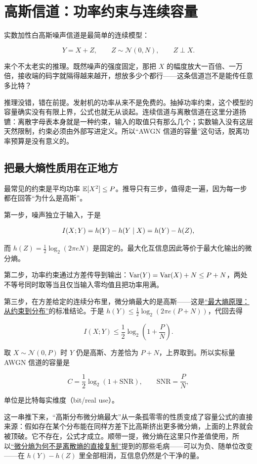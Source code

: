 \section{高斯信道：功率约束与连续容量}
\label{sec:07-Information-Theory/05-Channel-Coding/04}

实数加性白高斯噪声信道是最简单的连续模型：

\[
Y=X+Z,\qquad Z\sim\mathcal N(0,N),\qquad Z\perp X.
\]

来个不太老实的推理。既然噪声的强度固定，那把 \(X\) 的幅度放大一百倍、一万倍，接收端的码字就隔得越来越开，想放多少个都行——这条信道岂不是能传任意多比特？

推理没错，错在前提。发射机的功率从来不是免费的。抽掉功率约束，这个模型的容量确实没有有限上界，公式也就无从谈起。连续信道与离散信道在这里分道扬镳：离散字母表本身就是一种约束，输入的取值只有那么几个；实数输入没有这层天然限制，约束必须由外部写进定义。所以``AWGN 信道的容量''这句话，脱离功率预算是没有意义的。

\subsection{把最大熵性质用在正地方}

最常见的约束是平均功率 \(\mathbb{E}[X^2]\le P\)。推导只有三步，值得走一遍，因为每一步都在回答``为什么是高斯''。

第一步，噪声独立于输入，于是

\[
I(X;Y)=h(Y)-h(Y\mid X)=h(Y)-h(Z),
\]

而 \(h(Z)=\frac12\log_2(2\pi eN)\) 是固定的。最大化互信息因此等价于最大化输出的微分熵。

第二步，功率约束通过方差传导到输出：\(\operatorname{Var}(Y)=\operatorname{Var}(X)+N\le P+N\)，两处不等号同时取等当且仅当输入零均值且把功率用满。

第三步，在方差给定的连续分布里，微分熵最大的是高斯——这是\hyperref[sec:07-Information-Theory/01-Information-and-Entropy/04]{``最大熵原理：从约束到分布''}的标准结论。于是 \(h(Y)\le\frac12\log_2(2\pi e(P+N))\)，代回去得

\[
I(X;Y)\le\frac12\log_2\!\left(1+\frac{P}{N}\right).
\]

取 \(X\sim\mathcal N(0,P)\) 时 \(Y\) 仍是高斯、方差恰为 \(P+N\)，上界取到。所以实标量 AWGN 信道的容量是

\[
C=\frac12\log_2(1+\mathrm{SNR}),\qquad \mathrm{SNR}=\frac{P}{N},
\]

单位是比特每实维度（bit/real use）。

这一串推下来，``高斯分布微分熵最大''从一条孤零零的性质变成了容量公式的直接来源：假如存在某个分布能在同样方差下比高斯挤出更多微分熵，上面的上界就会被顶破。它不存在，公式才成立。顺带一提，微分熵在这里只作差值使用，所以\hyperref[sec:07-Information-Theory/01-Information-and-Entropy/03]{``微分熵为何不是离散熵的直接复制''}提到的那些毛病——可以为负、随单位改变——在 \(h(Y)-h(Z)\) 里全部相消，互信息仍然是个干净的量。

